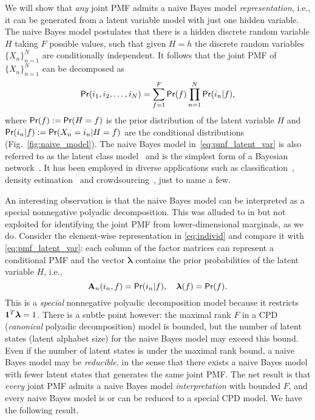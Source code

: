 \documentclass[journal]{IEEEtran}
\begin{document}
We will show that {\em any} joint PMF admits a naive Bayes model {\em representation}, i.e., it can be generated from a latent variable model with just one hidden variable. The naive Bayes model postulates that there is a hidden discrete random variable $H$ taking $F$ possible values, such that given $H=h$ the discrete random variables $\{X_n\}_{n=1}^N$ are conditionally independent. It follows that the joint PMF of $\{X_n\}_{n=1}^N$ can be decomposed as
\begin{equation}\label{eq:pmf_latent_var}
\begin{aligned}
{\sf Pr}(i_1,i_2,\ldots,i_N) = \sum_{f=1}^F {\sf Pr}(f) \prod_{n=1}^N {\sf Pr}(i_n | f)
\end{aligned},
\end{equation}
where ${\sf Pr}(f) := {\sf Pr}(H = f) $ is the prior distribution of the latent variable $H$ and ${\sf Pr}(i_n | f) := {\sf Pr}( X_n = i_n | H = f) $ are the conditional distributions (Fig.~\ref{fig:naive_model}). 
The naive Bayes model in~\eqref{eq:pmf_latent_var} is also referred to as the latent class model~\cite{Zhang2004} and is the simplest form of a Bayesian network~\cite{KoFrie2009}. It has been employed in diverse applications such as classification~\cite{NgJo2002}, density estimation~\cite{LoDo2005} and crowdsourcing~\cite{DaSke1979}, just to name a few. 

An interesting observation is that the naive Bayes model can be interpreted as a special nonnegative polyadic decomposition. This was alluded to in \cite{ShaHa2005,LiCo2009} but not exploited for identifying the joint PMF from { lower-dimensional marginals}, as we do. Consider the element-wise representation in \eqref{eq:individ} and compare it with \eqref{eq:pmf_latent_var}: each column of the factor matrices can represent a conditional PMF and the vector $\boldsymbol{\lambda}$ contains the prior probabilities of the latent variable $H$, i.e., 
\begin{equation}\label{eq:link}
\mathbf{A}_n(i_n,f) = {\sf Pr}(i_n | f), \quad \boldsymbol{\lambda}(f) = {\sf Pr}(f).
\end{equation} 
This is a {\em special} nonnegative polyadic decomposition model because it restricts ${\bf 1}^T \boldsymbol{\lambda} = 1$. There is a subtle point however: the maximal rank $F$ in a CPD ({\em canonical} polyadic decomposition) model is bounded, but the number of latent states (latent alphabet size) for the naive Bayes model may exceed this bound. Even if the number of latent states is under the maximal rank bound, a naive Bayes model may be {\em reducible}, in the sense that there exists a naive Bayes model with fewer latent states that generates the same joint PMF. The net result is that {\em every} joint PMF admits a naive Bayes model {\em interpretation} with bounded $F$, and every naive Bayes model is or can be reduced to a  special CPD model. We have the following result.    
\end{document}
